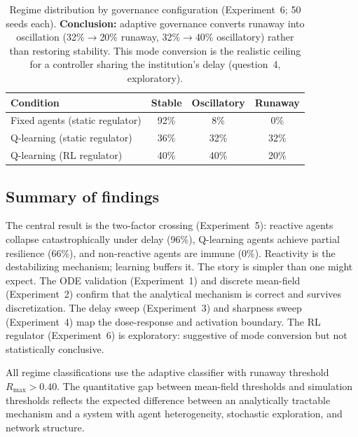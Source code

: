 \begin{table}[ht]
\centering
\begin{tabular}{lccc}
\toprule
Condition & Stable & Oscillatory & Runaway \\
\midrule
Fixed agents (static regulator) & 92\% & 8\% & 0\% \\
Q-learning (static regulator)   & 36\% & 32\% & 32\% \\
Q-learning (RL regulator)       & 40\% & 40\% & 20\% \\
\bottomrule
\end{tabular}
\caption{Regime distribution by governance configuration (Experiment~6; 50 seeds each). \textbf{Conclusion:} adaptive governance converts runaway into oscillation (32\%$\to$20\% runaway, 32\%$\to$40\% oscillatory) rather than restoring stability. This mode conversion is the realistic ceiling for a controller sharing the institution's delay (question~4, exploratory).}
\label{tab:ablation}
\end{table}

\subsection{Summary of findings}

The central result is the two-factor crossing (Experiment~5): reactive agents collapse catastrophically under delay (96\%), Q-learning agents achieve partial resilience (66\%), and non-reactive agents are immune (0\%). Reactivity is the destabilizing mechanism; learning buffers it. The story is simpler than one might expect. The ODE validation (Experiment~1) and discrete mean-field (Experiment~2) confirm that the analytical mechanism is correct and survives discretization. The delay sweep (Experiment~3) and sharpness sweep (Experiment~4) map the dose-response and activation boundary. The RL regulator (Experiment~6) is exploratory: suggestive of mode conversion but not statistically conclusive.

All regime classifications use the adaptive classifier with runaway threshold $R_{\max}>0.40$. The quantitative gap between mean-field thresholds and simulation thresholds reflects the expected difference between an analytically tractable mechanism and a system with agent heterogeneity, stochastic exploration, and network structure.
